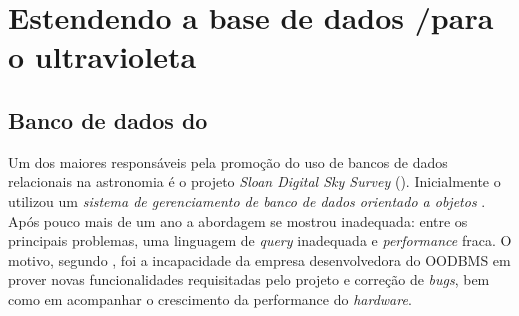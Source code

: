 


\chapter{Estendendo a base de dados \SDSS/\STARLIGHT para o ultravioleta}
\label{sec:Crossmatch}



\section{Banco de dados do \SDSS}

Um dos maiores responsáveis pela promoção do uso de bancos de dados relacionais
na astronomia é o projeto {\em Sloan Digital Sky Survey} (\SDSS). Inicialmente o
\SDSS utilizou um {\em sistema de gerenciamento de banco de dados orientado a
objetos} \citep[{\em Object Oriented Database Management System},
OODBMS;][]{Maier1986}. Após pouco mais de um ano a abordagem se mostrou
inadequada: entre os principais problemas, uma linguagem de {\em query}
inadequada e {\em performance} fraca. O motivo, segundo \citet{Thakar2004}, foi
a incapacidade da empresa desenvolvedora do OODBMS em prover novas
funcionalidades requisitadas pelo projeto e correção de {\em bugs}, bem como em
acompanhar o crescimento da performance do {\em hardware}.

